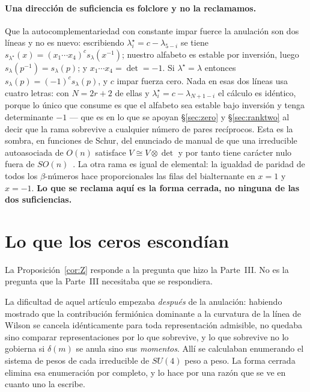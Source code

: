 \documentclass[11pt,a4paper]{article}
\newcommand{\su}[1]{SU(#1)}
\begin{document}
\paragraph{Una direcci\'on de suficiencia es folclore y no la reclamamos.} Que la
autocomplementariedad con constante impar fuerce la anulaci\'on son dos l\'ineas y no es nuevo:
escribiendo $\lambda^\star_i=c-\lambda_{5-i}$ se tiene $s_{\lambda^\star}(x)=(x_1\cdots x_4)^c
s_\lambda(x^{-1})$; nuestro alfabeto es estable por inversi\'on, luego
$s_\lambda(p^{-1})=s_\lambda(p)$; y $x_1\cdots x_4=\det=-1$. Si $\lambda^\star=\lambda$
entonces $s_\lambda(p)=(-1)^cs_\lambda(p)$, y $c$ impar fuerza cero. Nada en esas dos l\'ineas usa
cuatro letras: con $N=2r+2$ de ellas y $\lambda^\star_i=c-\lambda_{N+1-i}$ el c\'alculo es
id\'entico, porque lo \'unico que consume es que el alfabeto sea estable bajo inversi\'on y tenga
determinante $-1$ --- que es en lo que se apoyan \S\ref{sec:zero} y \S\ref{sec:ranktwo} al decir
que la rama sobrevive a cualquier n\'umero de pares rec\'iprocos. Esta es la sombra, en
funciones de Schur, del enunciado de manual de que una irreducible autoasociada de $O(n)$
satisface $V\cong V\otimes\det$ y por tanto tiene car\'acter nulo fuera de
$SO(n)$~\cite[Cap.~XI, \S11.6, \S11.8]{LittlewoodBook}. La otra rama es igual de elemental: la
igualdad de paridad de todos los $\beta$-n\'umeros hace proporcionales las filas del
bialternante en $x=1$ y $x=-1$. \textbf{Lo que se reclama aqu\'i es la forma cerrada, no
ninguna de las dos suficiencias.}

\section{Lo que los ceros escond\'ian}\label{sec:moments}

La Proposici\'on~\ref{cor:Z} responde a la pregunta que hizo la Parte~III. No es la pregunta que la
Parte~III necesitaba que se respondiera.

La dificultad de aquel art\'iculo empezaba \emph{despu\'es} de la anulaci\'on: habiendo
mostrado que la contribuci\'on fermi\'onica dominante a la curvatura de la l\'inea de Wilson se
cancela id\'enticamente para toda representaci\'on admisible, no quedaba sino comparar
representaciones por lo que sobrevive, y lo que sobrevive no lo gobierna si $\delta(m)$ se
anula sino sus \emph{momentos}. All\'i se calculaban enumerando el sistema de pesos de cada
irreducible de $\su4$ peso a peso. La forma cerrada elimina esa enumeraci\'on por completo, y
lo hace por una raz\'on que se ve en cuanto uno la escribe.
\end{document}
